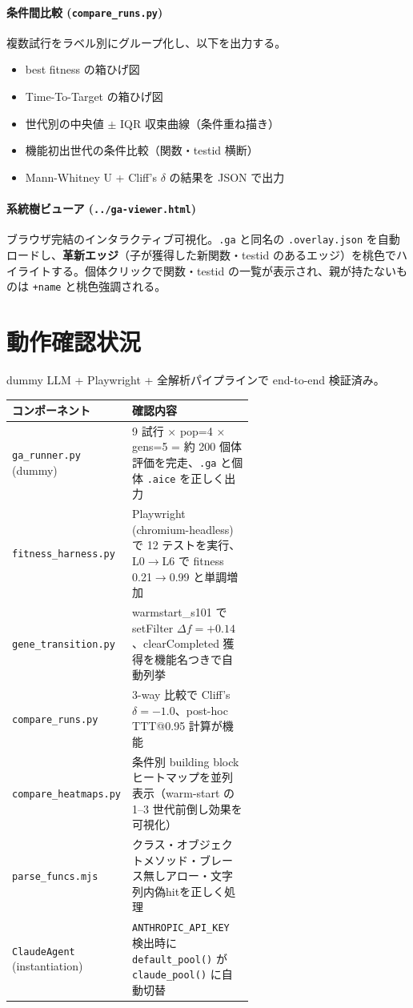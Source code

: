 \documentclass[a4paper,11pt]{ltjsarticle}
\begin{document}
\paragraph{条件間比較 (\texttt{compare\_runs.py})}
複数試行をラベル別にグループ化し、以下を出力する。
\begin{itemize}[leftmargin=2em,itemsep=2pt]
  \item best fitness の箱ひげ図
  \item Time-To-Target の箱ひげ図
  \item 世代別の中央値 $\pm$ IQR 収束曲線（条件重ね描き）
  \item 機能初出世代の条件比較（関数・testid 横断）
  \item Mann-Whitney U + Cliff's $\delta$ の結果を JSON で出力
\end{itemize}

\paragraph{系統樹ビューア (\texttt{../ga-viewer.html})}
ブラウザ完結のインタラクティブ可視化。\texttt{.ga} と同名の \texttt{.overlay.json} を自動ロードし、\textbf{革新エッジ}（子が獲得した新関数・testid のあるエッジ）を桃色でハイライトする。個体クリックで関数・testid の一覧が表示され、親が持たないものは \texttt{+name} と桃色強調される。

\section{動作確認状況}

dummy LLM + Playwright + 全解析パイプラインで end-to-end 検証済み。

\begin{center}
\begin{tabular}{@{}lp{0.6\linewidth}@{}}
\toprule
コンポーネント & 確認内容 \\
\midrule
\texttt{ga\_runner.py} (dummy) & 9 試行 × pop=4 × gens=5 = 約 200 個体評価を完走、\texttt{.ga} と個体 \texttt{.aice} を正しく出力 \\
\texttt{fitness\_harness.py} & Playwright (chromium-headless) で 12 テストを実行、L0$\to$L6 で fitness 0.21$\to$0.99 と単調増加 \\
\texttt{gene\_transition.py} & warmstart\_s101 で setFilter $\Delta f=+0.14$、clearCompleted 獲得を機能名つきで自動列挙 \\
\texttt{compare\_runs.py} & 3-way 比較で Cliff's $\delta = -1.0$、post-hoc TTT@0.95 計算が機能 \\
\texttt{compare\_heatmaps.py} & 条件別 building block ヒートマップを並列表示（warm-start の 1--3 世代前倒し効果を可視化）\\
\texttt{parse\_funcs.mjs} & クラス・オブジェクトメソッド・ブレース無しアロー・文字列内偽hitを正しく処理 \\
\texttt{ClaudeAgent} (instantiation) & \texttt{ANTHROPIC\_API\_KEY} 検出時に \texttt{default\_pool()} が \texttt{claude\_pool()} に自動切替 \\
\bottomrule
\end{tabular}
\end{center}
\end{document}
